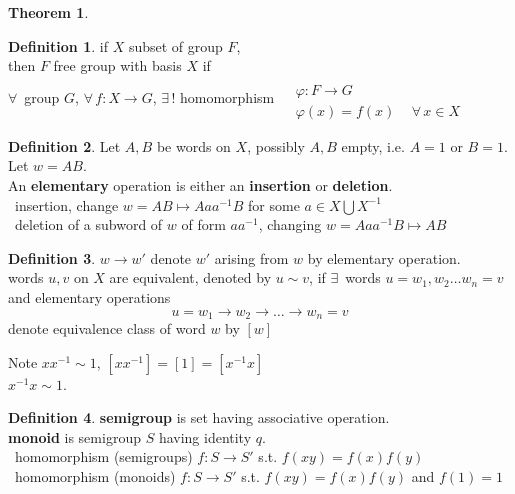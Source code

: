 \documentclass[twoside,landscape]{amsart}
\theoremstyle{plain}
\newtheorem{theorem}{Theorem}
\theoremstyle{definition}
\newtheorem{definition}{Definition}
\theoremstyle{remark}
\begin{document}
\begin{multicols*}{2}
\begin{theorem}
\end{theorem}




\begin{definition}
  if $X$ subset of group $F$, \\
then $F$ free group with basis $X$ if \\
$\forall \, $ group $G$, $\forall \, f: X\to G$, $\exists \, !$ homomorphism $\begin{aligned} & \quad \\
  & \varphi : F \to G \\
  & \varphi(x) = f(x) \quad \, \forall \, x \in X \end{aligned}$



\end{definition}


\begin{definition}
  Let $A,B$ be words on $X$, possibly $A,B$ empty, i.e. $A=1$ or $B=1$.  Let $w=AB$.  \\
An \textbf{elementary} operation is either an \textbf{insertion} or \textbf{deletion}.   \\
\qquad \, insertion, change $w=AB \mapsto Aaa^{-1} B$ for some $a\in X \bigcup X^{-1}$ \\
\qquad \, deletion of a subword of $w$ of form $aa^{-1}$, changing $w= Aaa^{-1}B \mapsto AB$
\end{definition}

\begin{definition}
  $w\to w'$ denote $w'$ arising from $w$ by elementary operation.  \\
words $u,v$ on $X$ are equivalent, denoted by $u\sim v$, if $\exists \, $ words $u=w_1,w_2 \dots w_n = v$ and elementary operations
\[
u=w_1 \to w_2 \to \dots \to w_n =v
\]
denote equivalence class of word $w$ by $[w]$
\end{definition}
Note $xx^{-1} \sim 1$, $[xx^{-1}] = [1] = [x^{-1}x]$ \\
\phantom{Note} $x^{-1}x\sim 1$.  

\begin{definition}
  \textbf{semigroup} is set having associative operation.  \\
\textbf{monoid} is semigroup $S$ having identity $q$.  \\
\qquad \, homomorphism (semigroups) $f:S\to S'$ s.t. $f(xy) = f(x)f(y)$  \\
\qquad \, homomorphism (monoids) $f:S\to S'$ s.t. $f(xy) = f(x)f(y)$ and $f(1)=1$  
\end{definition}


\end{multicols*}
\end{document}
